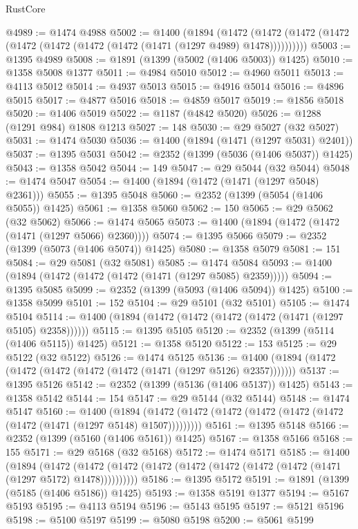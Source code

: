 \begin{lexlean}{RustCore}
\begin{coremodule}
@4989 := @1474 @4988
@5002 := @1400
    (@1894
      (@1472 (@1472 (@1472 (@1472 (@1472 (@1472 (@1472 (@1472 (@1471 (@1297 @4989) @1478))))))))))
@5003 := @1395 @4989
@5008 := @1891 (@1399 (@5002 (@1406 @5003)) @1425)
@5010 := @1358 @5008 @1377
@5011 := @4984 @5010
@5012 := @4960 @5011
@5013 := @4113 @5012
@5014 := @4937 @5013
@5015 := @4916 @5014
@5016 := @4896 @5015
@5017 := @4877 @5016
@5018 := @4859 @5017
@5019 := @1856 @5018
@5020 := @1406 @5019
@5022 := @1187 (@4842 @5020)
@5026 := @1288 (@1291 @984) @1808 @1213
@5027 := 148
@5030 := @29 @5027 (@32 @5027)
@5031 := @1474 @5030
@5036 := @1400 (@1894 (@1471 (@1297 @5031) @2401))
@5037 := @1395 @5031
@5042 := @2352 (@1399 (@5036 (@1406 @5037)) @1425)
@5043 := @1358 @5042
@5044 := 149
@5047 := @29 @5044 (@32 @5044)
@5048 := @1474 @5047
@5054 := @1400 (@1894 (@1472 (@1471 (@1297 @5048) @2361)))
@5055 := @1395 @5048
@5060 := @2352 (@1399 (@5054 (@1406 @5055)) @1425)
@5061 := @1358 @5060
@5062 := 150
@5065 := @29 @5062 (@32 @5062)
@5066 := @1474 @5065
@5073 := @1400 (@1894 (@1472 (@1472 (@1471 (@1297 @5066) @2360))))
@5074 := @1395 @5066
@5079 := @2352 (@1399 (@5073 (@1406 @5074)) @1425)
@5080 := @1358 @5079
@5081 := 151
@5084 := @29 @5081 (@32 @5081)
@5085 := @1474 @5084
@5093 := @1400 (@1894 (@1472 (@1472 (@1472 (@1471 (@1297 @5085) @2359)))))
@5094 := @1395 @5085
@5099 := @2352 (@1399 (@5093 (@1406 @5094)) @1425)
@5100 := @1358 @5099
@5101 := 152
@5104 := @29 @5101 (@32 @5101)
@5105 := @1474 @5104
@5114 := @1400 (@1894 (@1472 (@1472 (@1472 (@1472 (@1471 (@1297 @5105) @2358))))))
@5115 := @1395 @5105
@5120 := @2352 (@1399 (@5114 (@1406 @5115)) @1425)
@5121 := @1358 @5120
@5122 := 153
@5125 := @29 @5122 (@32 @5122)
@5126 := @1474 @5125
@5136 := @1400 (@1894 (@1472 (@1472 (@1472 (@1472 (@1472 (@1471 (@1297 @5126) @2357)))))))
@5137 := @1395 @5126
@5142 := @2352 (@1399 (@5136 (@1406 @5137)) @1425)
@5143 := @1358 @5142
@5144 := 154
@5147 := @29 @5144 (@32 @5144)
@5148 := @1474 @5147
@5160 := @1400
    (@1894 (@1472 (@1472 (@1472 (@1472 (@1472 (@1472 (@1472 (@1471 (@1297 @5148) @1507)))))))))
@5161 := @1395 @5148
@5166 := @2352 (@1399 (@5160 (@1406 @5161)) @1425)
@5167 := @1358 @5166
@5168 := 155
@5171 := @29 @5168 (@32 @5168)
@5172 := @1474 @5171
@5185 := @1400
    (@1894
      (@1472 (@1472 (@1472 (@1472 (@1472 (@1472 (@1472 (@1472 (@1471 (@1297 @5172) @1478))))))))))
@5186 := @1395 @5172
@5191 := @1891 (@1399 (@5185 (@1406 @5186)) @1425)
@5193 := @1358 @5191 @1377
@5194 := @5167 @5193
@5195 := @4113 @5194
@5196 := @5143 @5195
@5197 := @5121 @5196
@5198 := @5100 @5197
@5199 := @5080 @5198
@5200 := @5061 @5199

\end{coremodule}
\end{lexlean}
